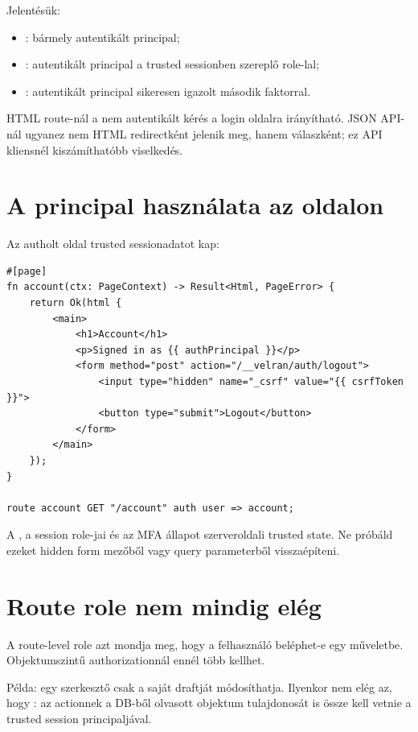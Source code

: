 Jelentésük:

\begin{itemize}
  \item {}: bármely autentikált principal;
  \item {}: autentikált principal a trusted sessionben szereplő  role-lal;
  \item {}: autentikált principal sikeresen igazolt második faktorral.
\end{itemize}

HTML route-nál a nem autentikált kérés a login oldalra irányítható. JSON API-nál ugyanez nem HTML redirectként jelenik meg, hanem  válaszként; ez API kliensnél kiszámíthatóbb viselkedés.

\section{A principal használata az oldalon}

Az autholt oldal trusted sessionadatot kap:

\begin{lstlisting}[language=Velran]
#[page]
fn account(ctx: PageContext) -> Result<Html, PageError> {
    return Ok(html {
        <main>
            <h1>Account</h1>
            <p>Signed in as {{ authPrincipal }}</p>
            <form method="post" action="/__velran/auth/logout">
                <input type="hidden" name="_csrf" value="{{ csrfToken }}">
                <button type="submit">Logout</button>
            </form>
        </main>
    });
}

route account GET "/account" auth user => account;
\end{lstlisting}

A , a session role-jai és az MFA állapot szerveroldali trusted state. Ne próbáld ezeket hidden form mezőből vagy query parameterből visszaépíteni.

\section{Route role nem mindig elég}

A route-level role azt mondja meg, hogy a felhasználó beléphet-e egy műveletbe. Objektumszintű authorizationnál ennél több kellhet.

Példa: egy szerkesztő csak a saját draftját módosíthatja. Ilyenkor nem elég az, hogy : az actionnek a DB-ből olvasott objektum tulajdonosát is össze kell vetnie a trusted session principaljával.

